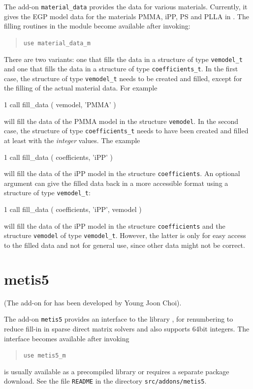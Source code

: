 The add-on \texttt{material\_data} provides the data for various materials. Currently, it gives the EGP model data for the materials PMMA, iPP, PS and PLLA in \cite{van_breemen_rate_2012}. The filling routines in the module become available after invoking:
\begin{quote}
   \texttt{use material\_data\_m}
\end{quote}
There are two variants: one that fills the data in a structure of type \texttt{vemodel\_t} and one that fills the data in a structure of type \texttt{coefficients\_t}. In the first case, the structure of type \texttt{vemodel\_t} needs to be created and filled, except for the filling of the actual material data. 
For example
\begin{listing}{1}
   call fill_data ( vemodel, 'PMMA' )
\end{listing}
will fill the data of the PMMA model in the structure \texttt{vemodel}. 
In the second case, the structure of type \texttt{coefficients\_t} needs to have been created and filled at least with the \emph{integer} values.
The example
\begin{listing}{1}
   call fill_data ( coefficients, 'iPP' )
\end{listing}
will fill the data of the iPP model in the structure \texttt{coefficients}. An optional argument can give the filled
data back in a more accessible format using a structure of type \texttt{vemodel\_t}:
\begin{listing}{1}
   call fill_data ( coefficients, 'iPP', vemodel )
\end{listing}
will fill the data of the iPP model in the structure \texttt{coefficients} and the structure \texttt{vemodel} of type \texttt{vemodel\_t}. However, the latter is only for easy access to the filled data and not for general use, since other data might not be correct.

\section{metis5}

\label{sec:metis5}
(The add-on for  has been developed by Young Joon Choi).

The add-on \texttt{metis5} provides an interface to the library , for renumbering to
reduce fill-in in sparse direct matrix solvers and also supports 64bit integers. The interface becomes available after invoking
\begin{quote}
   \texttt{use metis5\_m}
\end{quote}
 is usually available as a precompiled library or requires a separate package download. See the file \texttt{README} in
the directory \texttt{src/addons/metis5}.

